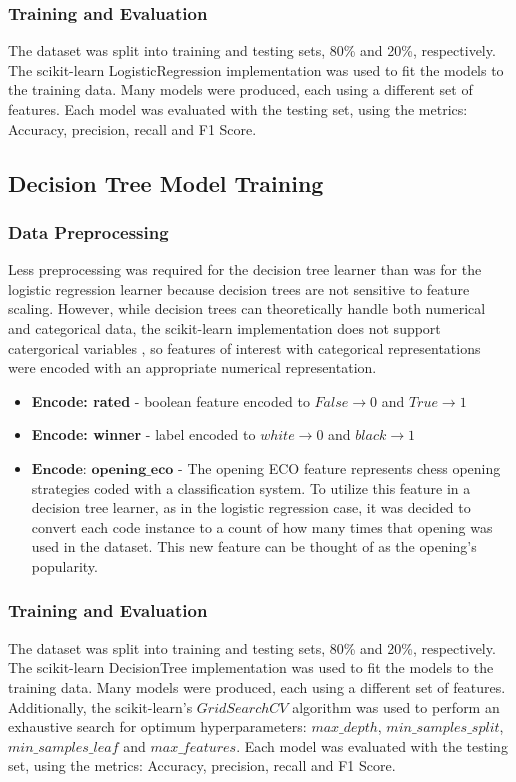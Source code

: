 \documentclass[12pt]{article}
\begin{document}
\subsubsection{Training and Evaluation}

The dataset was split into training and testing sets, 80\% and 20\%, respectively. The scikit-learn LogisticRegression implementation was used to fit the models to the training data. Many models were produced, each using a different set of features. Each model was evaluated with the testing set, using the metrics: Accuracy, precision, recall and F1 Score.

\subsection{Decision Tree Model Training}

\subsubsection{Data Preprocessing}
Less preprocessing was required for the decision tree learner than was for the logistic regression learner because decision trees are not sensitive to feature scaling. However, while decision trees can theoretically handle both numerical and categorical data, the scikit-learn implementation does not support catergorical variables \cite{sklearnDT}, so features of interest with categorical representations were encoded with an appropriate numerical representation.

\begin{itemize}[label={}, leftmargin=0pt]
  \item \textbf{Encode: rated} - boolean feature encoded to $False \rightarrow 0$ and $True \rightarrow 1$
  \item \textbf{Encode: winner} - label encoded to $white \rightarrow 0$ and $black \rightarrow 1$
  \item $\textbf{Encode: opening\_eco}$ - The opening ECO feature represents chess opening strategies coded with a classification system. To utilize this feature in a decision tree learner, as in the logistic regression case, it was decided to convert each code instance to a count of how many times that opening was used in the dataset. This new feature can be thought of as the opening's popularity. 
\end{itemize}

\subsubsection{Training and Evaluation}
The dataset was split into training and testing sets, 80\% and 20\%, respectively. The scikit-learn DecisionTree implementation was used to fit the models to the training data. Many models were produced, each using a different set of features. Additionally, the scikit-learn's $GridSearchCV$ \cite{sklearnGSCV} algorithm was used to perform an exhaustive search for optimum hyperparameters: $max\_depth$, $min\_samples\_split$, $min\_samples\_leaf$ and $max\_features$. Each model was evaluated with the testing set, using the metrics: Accuracy, precision, recall and F1 Score.
\end{document}
